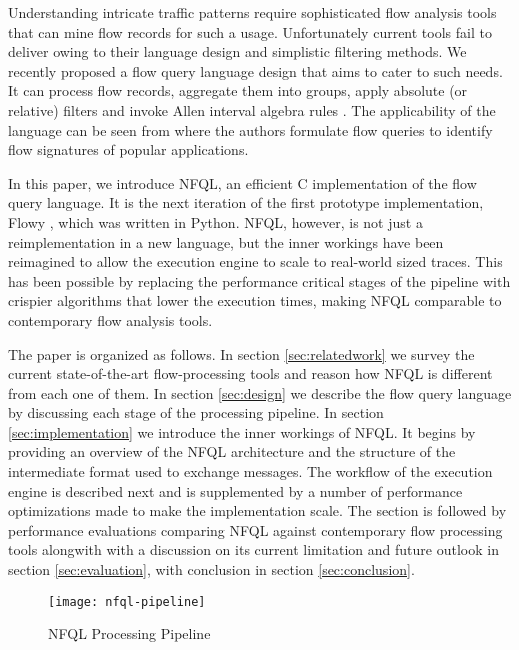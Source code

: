 Understanding intricate traffic patterns require sophisticated flow analysis
tools that can mine flow records for such a usage.  Unfortunately current
tools fail to deliver owing to their language design and simplistic filtering
methods.  We recently proposed a flow query language design
\cite{vmarinov:2009} that aims to cater to such needs.  It can process
flow records, aggregate them into groups, apply absolute (or relative) filters
and invoke Allen interval algebra rules \cite{fallen:1983}. The applicability
of the language can be seen from \cite{vperelman:2011} where the authors
formulate flow queries to identify flow signatures of popular applications.

In this paper, we introduce \ac{NFQL}, an efficient C implementation of the
flow query language. It is the next iteration of the first prototype
implementation, Flowy \cite{kkanev:2010}, which was written in Python.
\ac{NFQL}, however, is not just a reimplementation in a new language, but the
inner workings have been reimagined to allow the execution engine to scale to
real-world sized traces. This has been possible by replacing the performance
critical stages of the pipeline with crispier algorithms that lower the
execution times, making \ac{NFQL} comparable to contemporary flow analysis
tools.

The paper is organized as follows. In section \ref{sec:relatedwork} we survey
the current state-of-the-art flow-processing tools and reason how \ac{NFQL} is
different from each one of them. In section \ref{sec:design} we describe the
flow query language by discussing each stage of the processing pipeline. In
section \ref{sec:implementation} we introduce the inner workings of \ac{NFQL}.
It begins by providing an overview of the \ac{NFQL} architecture and the
structure of the intermediate format used to exchange messages. The workflow
of the execution engine is described next and is supplemented by a number of
performance optimizations made to make the implementation scale. The section
is followed by performance evaluations comparing \ac{NFQL} against
contemporary flow processing tools alongwith with a discussion on its current
limitation and future outlook in section \ref{sec:evaluation}, with conclusion
in section \ref{sec:conclusion}.

\begin{figure*}[!t]
\centering
\texttt{[image: nfql-pipeline]}
\caption{NFQL Processing Pipeline \cite{vmarinov:2009}}
\label{fig:nfql-pipeline}
\end{figure*}

